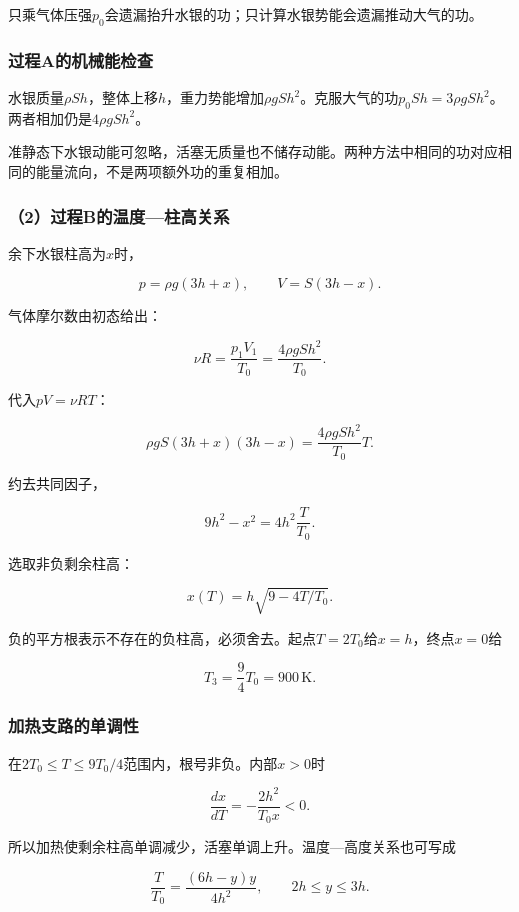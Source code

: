 \documentclass[12pt,a4paper,fontset=fandol]{ctexart}
\begin{document}
只乘气体压强\(p_0\)会遗漏抬升水银的功；只计算水银势能会遗漏推动大气的功。

\subsubsection{过程A的机械能检查}\label{ux8fc7ux7a0baux7684ux673aux68b0ux80fdux68c0ux67e5}

水银质量\(\rho Sh\)，整体上移\(h\)，重力势能增加\(\rho gSh^2\)。克服大气的功\(p_0Sh=3\rho gSh^2\)。两者相加仍是\(4\rho gSh^2\)。

准静态下水银动能可忽略，活塞无质量也不储存动能。两种方法中相同的功对应相同的能量流向，不是两项额外功的重复相加。

\subsubsection{（2）过程B的温度---柱高关系}\label{ux8fc7ux7a0bbux7684ux6e29ux5ea6ux67f1ux9ad8ux5173ux7cfb}

余下水银柱高为\(x\)时，

\[
p=\rho g(3h+x),\qquad
V=S(3h-x).
\]

气体摩尔数由初态给出：

\[
\nu R=\frac{p_1V_1}{T_0}
=\frac{4\rho gSh^2}{T_0}.
\]

代入\(pV=\nu RT\)：

\[
\rho gS(3h+x)(3h-x)
=\frac{4\rho gSh^2}{T_0}T.
\]

约去共同因子，

\[
9h^2-x^2=4h^2\frac T{T_0}.
\]

选取非负剩余柱高：

\[
\boxed{x(T)=h\sqrt{9-4T/T_0}}.
\]

负的平方根表示不存在的负柱高，必须舍去。起点\(T=2T_0\)给\(x=h\)，终点\(x=0\)给

\[
\boxed{T_3=\frac94T_0=900\,\mathrm K}.
\]

\subsubsection{加热支路的单调性}\label{ux52a0ux70edux652fux8defux7684ux5355ux8c03ux6027}

在\(2T_0\leq T\leq9T_0/4\)范围内，根号非负。内部\(x>0\)时

\[
\frac{dx}{dT}=-\frac{2h^2}{T_0x}<0.
\]

所以加热使剩余柱高单调减少，活塞单调上升。温度---高度关系也可写成

\[
\frac T{T_0}
=\frac{(6h-y)y}{4h^2},
\qquad 2h\leq y\leq3h.
\]
\end{document}
